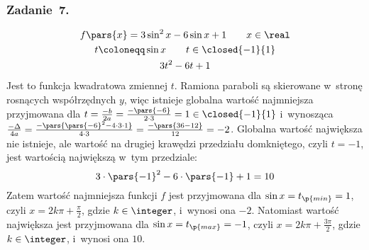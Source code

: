 \subsubsection*{Zadanie~7.}
\begin{gather*}
    f\pars{x} = 3\sin^2x - 6\sin x + 1 \qquad x \in \real\\
    t \coloneqq \sin x \qquad t \in \closed{-1}{1}\\
    3t^2 - 6t + 1
\end{gather*}
Jest to funkcja kwadratowa zmiennej \(t\). Ramiona paraboli są skierowane w~stronę rosnących współrzędnych \(y\), więc istnieje globalna wartość najmniejsza przyjmowana dla \(t = \frac{-b}{2a} = \frac{-\pars{-6}}{2 \cdot 3} = 1 \in \closed{-1}{1}\) i~wynosząca \(\frac{-\Delta}{4a} = \frac{-\pars{\pars{-6}^2 - 4 \cdot 3 \cdot 1}}{4 \cdot 3} = \frac{-\pars{36 - 12}}{12} = -2\). Globalna wartość największa nie istnieje, ale wartość na drugiej krawędzi przedziału domkniętego, czyli \(t = -1\), jest wartością największą w~tym przedziale:
\begin{equation*}
    3 \cdot \pars{-1}^2 - 6 \cdot \pars{-1} + 1 = 10
\end{equation*}
Zatem wartość najmniejsza funkcji \(f\) jest przyjmowana dla \(\sin x = t_\p{min} = 1\), czyli \(x = 2k\pi + \frac{\pi}{2}\), gdzie \(k \in \integer\), i~wynosi ona \(-2\). Natomiast wartość największa jest przyjmowana dla \(\sin x = t_\p{max} = -1\), czyli \(x = 2k\pi + \frac{3\pi}{2}\), gdzie \(k \in \integer\), i~wynosi ona \(10\).
